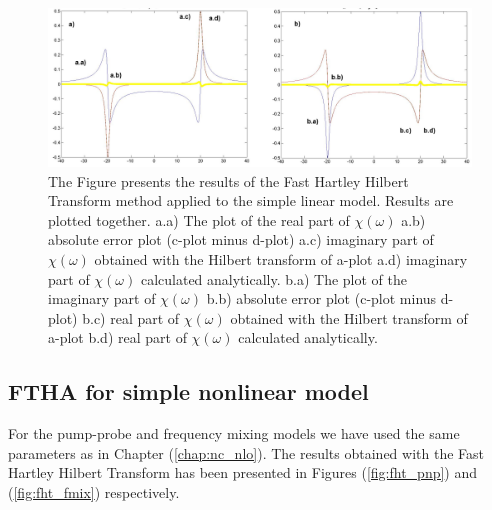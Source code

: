 \documentclass[12pt,twoside,a4paper]{article}
\numberwithin{equation}{subsection}
\numberwithin{figure}{subsection}
\begin{document}
\begin{figure} 
  \includegraphics[width=150mm]{img/fht_lin.png}
  \caption{The Figure presents the results of the Fast Hartley Hilbert Transform method applied to the simple linear
  model. Results are plotted together.
   a.a) The plot of the real part of $\chi (\omega )$ 
   a.b) absolute error plot (c-plot minus d-plot) 
   a.c) imaginary part of $\chi (\omega )$ obtained with the Hilbert transform of a-plot 
   a.d) imaginary part of $\chi (\omega )$  calculated analytically. 
   b.a) The plot of the imaginary part of $\chi (\omega )$ 
   b.b) absolute error plot (c-plot minus d-plot) 
   b.c) real part of $\chi (\omega )$ obtained with the Hilbert transform of a-plot 
   b.d) real part of $\chi (\omega )$ calculated analytically. \label{fig:fht_lin}
  }
\end{figure}

\subsection{FTHA for simple nonlinear model} \label{chap:hartley_nlo}

For the pump-probe and frequency mixing models we have used the same parameters as in Chapter (\ref{chap:nc_nlo}). The results
obtained with the Fast Hartley Hilbert Transform has been presented in Figures (\ref{fig:fht_pnp}) and (\ref{fig:fht_fmix})
respectively.
\end{document}
